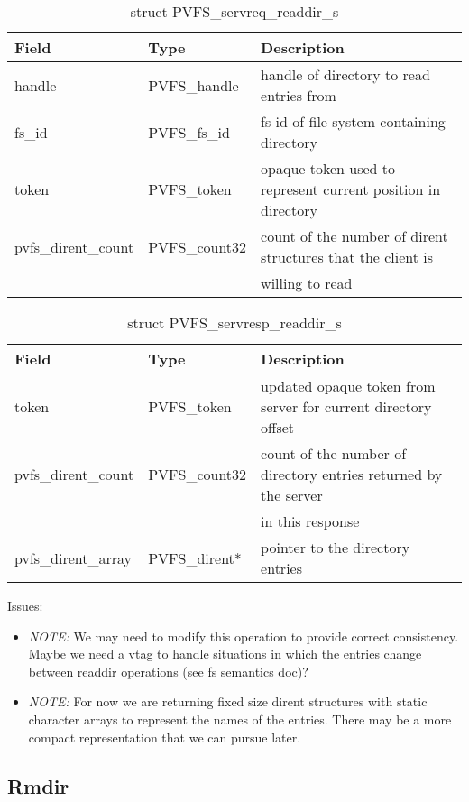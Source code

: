 \documentclass[11pt, letterpaper]{article} %
\begin{document}
\begin{table}[H]
\begin{tabular}{|l|l|l|}
\hline
Field & Type & Description \\
\hline
\hline
handle & PVFS\_handle & handle of directory to read entries from\\
\hline
fs\_id & PVFS\_fs\_id & fs id of file system containing directory\\
\hline
token & PVFS\_token & opaque token used to represent current position in
directory\\
\hline
pvfs\_dirent\_count & PVFS\_count32 & count of the number of dirent
structures that the client is\\
 & & willing to read\\
\hline
\end{tabular}
\caption{struct PVFS\_servreq\_readdir\_s \label{tab:reqreaddir}}
\end{table}

\begin{table}[H]
\begin{tabular}{|l|l|l|}
\hline
Field & Type & Description \\
\hline
\hline
token & PVFS\_token & updated opaque token from server for current
directory offset\\
\hline
pvfs\_dirent\_count & PVFS\_count32 & count of the number of directory
entries returned by the server\\
 & & in this response\\
\hline
pvfs\_dirent\_array & PVFS\_dirent* & pointer to the directory entries\\
\hline
\end{tabular}
\caption{struct PVFS\_servresp\_readdir\_s \label{tab:respreaddir}}
\end{table}

Issues:
\begin{itemize}
\item \emph{NOTE:} We may need to modify this operation to provide
correct consistency.  Maybe we need a vtag to handle situations in which
the entries change between readdir operations (see fs semantics doc)?
\item \emph{NOTE:} For now we are returning fixed size dirent structures
with static character arrays to represent the names of the entries.
There may be a more compact representation that we can pursue later.
\end{itemize}


\subsection{Rmdir}
\end{document}
